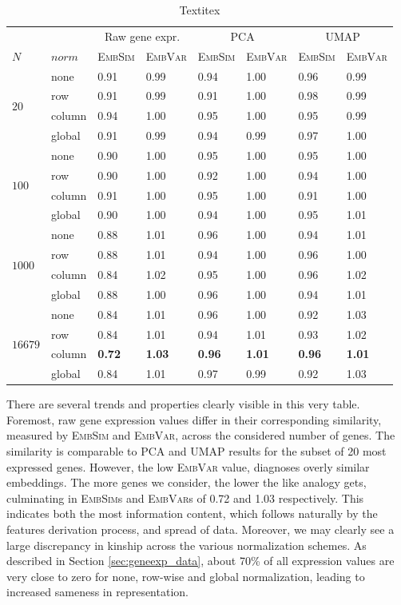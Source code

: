 \documentclass[]{article}
\begin{document}
\begin{table}
	\centering
	\renewcommand{\arraystretch}{1.2}
	
	\begin{tabular}{|ll|l|l|l|l|l|l|}
		\hline
		&&\multicolumn{2}{c|}{Raw gene expr. }&\multicolumn{2}{c|}{PCA}&\multicolumn{2}{c|}{UMAP}\\
		$N$&$norm$&\textsc{EmbSim}&\textsc{EmbVar}&\textsc{EmbSim}&\textsc{EmbVar}&\textsc{EmbSim}&\textsc{EmbVar}\\
		\hline
		\multirow{4}{*}{$20$}&none&0.91&0.99&0.94&1.00&0.96&0.99\\
		&row&0.91&0.99&0.91&1.00&0.98&0.99\\
		&column&0.94&1.00&0.95&1.00&0.95&0.99\\
		&global&0.91&0.99&0.94&0.99&0.97&1.00\\
		\hline
		\multirow{4}{*}{$100$}&none&0.90&1.00&0.95&1.00&0.95&1.00\\
		&row&0.90&1.00&0.92&1.00&0.94&1.00\\
		&column&0.91&1.00&0.95&1.00&0.91&1.00\\
		&global&0.90&1.00&0.94&1.00&0.95&1.01\\
		\hline
		\multirow{4}{*}{$1000$}&none&0.88&1.01&0.96&1.00&0.94&1.01\\
		&row&0.88&1.01&0.94&1.00&0.96&1.00\\
		&column&0.84&1.02&0.95&1.00&0.96&1.02\\
		&global&0.88&1.00&0.96&1.00&0.94&1.01\\
		\hline
		\multirow{4}{*}{$16679$}&none&0.84&1.01&0.96&1.00&0.92&1.03\\
		&row&0.84&1.01&0.94&1.01&0.93&1.02\\
		&column&\textbf{0.72}&\textbf{1.03}&\textbf{0.96}&\textbf{1.01}&\textbf{0.96}&\textbf{1.01}\\
		&global&0.84&1.01&0.97&0.99&0.92&1.03\\
		\hline
		
	\end{tabular}
	\caption{Textitex}
	\label{tab:gen_red_baseline}
\end{table}

There are several trends and properties clearly visible in this very table. Foremost, raw gene expression values differ in their corresponding similarity, measured by \textsc{EmbSim} and \textsc{EmbVar}, across the considered number of genes. The similarity is comparable to PCA and UMAP results for the subset of 20 most expressed genes. However, the low \textsc{EmbVar} value, diagnoses overly similar embeddings. The more genes we consider, the lower the like analogy gets, culminating in \textsc{EmbSim}s and \textsc{EmbVar}s of 0.72 and 1.03 respectively. This indicates both the most information content, which follows naturally by the features derivation process, and spread of data. 
Moreover, we may clearly see a large discrepancy in kinship across the various normalization schemes. As described in Section \ref{sec:geneexp_data}, about 70\% of all expression values are very close to zero for none, row-wise and global normalization, leading to increased sameness in representation. \\
\end{document}
